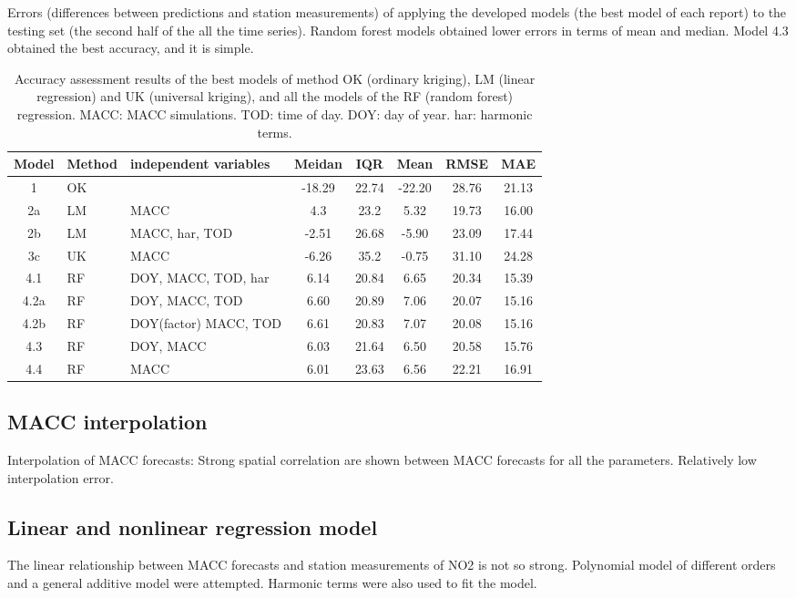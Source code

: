 \documentclass{article}
\begin{document}
Errors (differences between predictions and station measurements) of applying the developed models (the best model of each report) to the testing set (the second half of the all the time series). Random forest models obtained lower errors in terms of mean and median. Model 4.3 obtained the best accuracy, and it is simple.  
\begin{table}[h!]
\centering
\begin{tabular}{ c l l c c c c c}
 Model &Method& independent variables& Meidan & IQR& Mean&  RMSE& MAE \\
 \hline
 1     &OK & \-                 & -18.29 &	22.74&	-22.20 &	28.76 &	21.13\\
 2a    &LM & MACC                  & 4.3   & 23.2     & 5.32 & 19.73 & 16.00 \\
 2b    &LM & MACC, har, TOD   & -2.51 & 26.68 & -5.90 & 23.09 & 17.44\\ 
 3c    &UK & MACC             & -6.26 & 35.2 & -0.75 & 31.10 & 24.28\\
 4.1   &RF & DOY, MACC, TOD, har &  6.14 &	20.84 &	6.65 &	20.34 &	15.39\\
 4.2a  &RF & DOY, MACC, TOD                     & 6.60 &	20.89	& 7.06 &	20.07 &	15.16 \\
 4.2b  &RF & DOY(factor) MACC, TOD  & 6.61&	20.83	& 7.07 &	20.08	& 15.16 \\
 4.3   &RF & DOY, MACC              & 6.03&	21.64	& 6.50 &	20.58	& 15.76 \\
 4.4   &RF & MACC                   &6.01 &	23.63	& 6.56 &	22.21	& 16.91 \\
\hline
\end{tabular}
\caption{Accuracy assessment results of the best models of method OK (ordinary kriging), LM (linear regression) and UK (universal kriging), and all the models of the RF (random forest) regression. MACC: MACC simulations. TOD: time of day. DOY: day of year. har: harmonic terms.  
 } 
\label{table:result}
\end{table} 
 
 
 
\subsection{MACC interpolation} 
Interpolation of MACC forecasts: Strong spatial correlation are shown between MACC forecasts for all the parameters. Relatively low interpolation error.

\subsection{Linear and nonlinear regression model}  
The linear relationship between MACC forecasts and station measurements of NO2 is not so strong. Polynomial model of different orders and a general additive model were attempted. Harmonic terms were also used to fit the model.  
\end{document}
